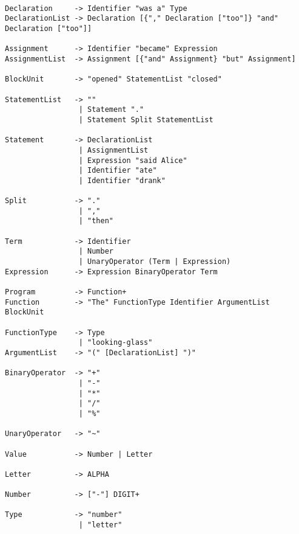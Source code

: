 \documentclass[a4wide, 11pt]{article}
\begin{document}
\begin{verbatim}

Declaration     -> Identifier "was a" Type
DeclarationList -> Declaration [{"," Declaration ["too"]} "and" Declaration ["too"]]

Assignment      -> Identifier "became" Expression
AssignmentList  -> Assignment [{"and" Assignment} "but" Assignment]

BlockUnit       -> "opened" StatementList "closed"

StatementList   -> ""
                 | Statement "."
                 | Statement Split StatementList
               
Statement       -> DeclarationList
                 | AssignmentList
                 | Expression "said Alice"
                 | Identifier "ate"
                 | Identifier "drank"

Split           -> "."
                 | ","
                 | "then"

Term            -> Identifier
                 | Number
                 | UnaryOperator (Term | Expression)
Expression      -> Expression BinaryOperator Term

Program         -> Function+
Function        -> "The" FunctionType Identifier ArgumentList BlockUnit

FunctionType    -> Type
                 | "looking-glass"
ArgumentList    -> "(" [DeclarationList] ")"

BinaryOperator  -> "+"
                 | "-"
                 | "*"
                 | "/" 
                 | "%"

UnaryOperator   -> "~" 

Value           -> Number | Letter

Letter          -> ALPHA

Number          -> ["-"] DIGIT+

Type            -> "number"
                 | "letter"

\end{verbatim}





    
\end{document}
